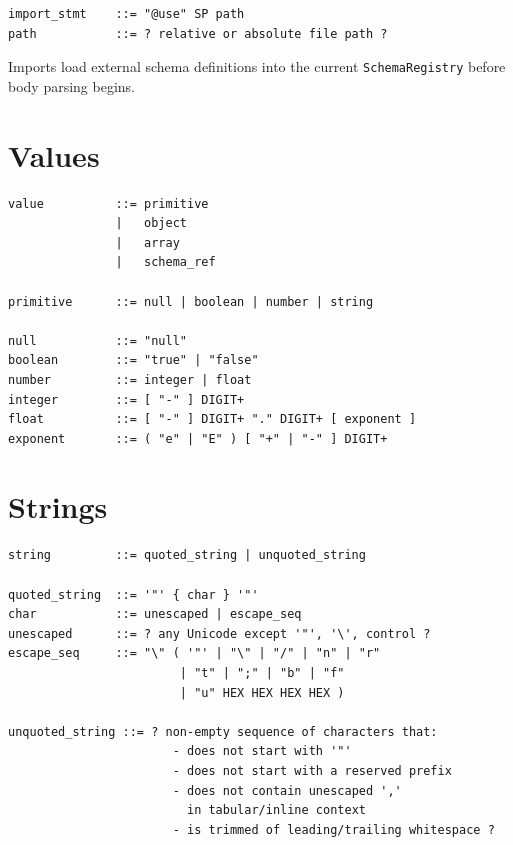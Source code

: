 \documentclass[11pt, a4paper]{article}
\begin{document}
\begin{lstlisting}[style=ebnf]
import_stmt    ::= "@use" SP path
path           ::= ? relative or absolute file path ?
\end{lstlisting}

\noindent Imports load external schema definitions into the current
\texttt{SchemaRegistry} before body parsing begins.

\section{Values}
\label{sec:values}

\begin{lstlisting}[style=ebnf]
value          ::= primitive
               |   object
               |   array
               |   schema_ref

primitive      ::= null | boolean | number | string

null           ::= "null"
boolean        ::= "true" | "false"
number         ::= integer | float
integer        ::= [ "-" ] DIGIT+
float          ::= [ "-" ] DIGIT+ "." DIGIT+ [ exponent ]
exponent       ::= ( "e" | "E" ) [ "+" | "-" ] DIGIT+
\end{lstlisting}

\section{Strings}
\label{sec:strings}

\begin{lstlisting}[style=ebnf]
string         ::= quoted_string | unquoted_string

quoted_string  ::= '"' { char } '"'
char           ::= unescaped | escape_seq
unescaped      ::= ? any Unicode except '"', '\', control ?
escape_seq     ::= "\" ( '"' | "\" | "/" | "n" | "r"
                        | "t" | ";" | "b" | "f"
                        | "u" HEX HEX HEX HEX )

unquoted_string ::= ? non-empty sequence of characters that:
                       - does not start with '"'
                       - does not start with a reserved prefix
                       - does not contain unescaped ','
                         in tabular/inline context
                       - is trimmed of leading/trailing whitespace ?
\end{lstlisting}
\end{document}
